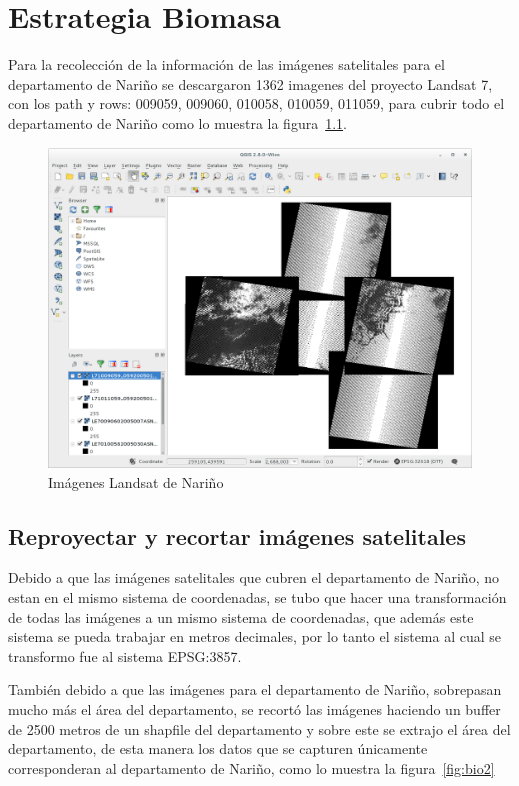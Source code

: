 \chapter{Estrategia Biomasa}

Para la recolección de la información de las imágenes satelitales para el departamento de Nariño se descargaron 1362 imagenes del proyecto
Landsat 7, con los path y rows: 009059, 009060, 010058, 010059, 011059, para cubrir todo el departamento de Nariño como lo muestra la figura~\ref{fig:bio1}.

\begin{figure}[!htb]
  \centering
  \includegraphics[width=12cm]{pictures/bio1.png}
  \caption{Imágenes Landsat de Nariño}
  \label{fig:bio1}
\end{figure}


\section{Reproyectar y recortar imágenes satelitales}

Debido a que las imágenes satelitales que cubren el departamento de Nariño, no estan en el mismo sistema de coordenadas, se tubo que hacer
una transformación de todas las imágenes a un mismo sistema de coordenadas, que además este sistema se pueda trabajar en metros decimales,
por lo tanto el sistema al cual se transformo fue al sistema EPSG:3857.

También debido a que las imágenes para el departamento de Nariño, sobrepasan mucho más el área del departamento, se recortó las imágenes
haciendo un buffer de 2500 metros de un shapfile del departamento y sobre este se extrajo el área del departamento, de esta manera los datos 
que se capturen únicamente corresponderan al departamento de Nariño, como lo muestra la figura~\ref{fig:bio2}

